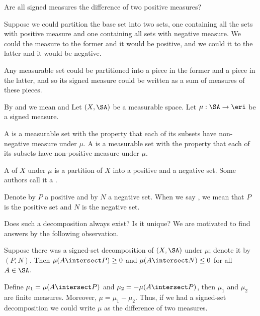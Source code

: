 \sbasic


\sstart



Are all signed measures
the difference of two
positive measures?

Suppose we could partition
the base set into two
sets, one containing
all the sets with positive
measure and one containing
all sets with negative measure.
We could
 the measure to
the former and it would
be positive, and we could
 it to the latter
and it would be negative.

Any measurable set could be partitioned
into a piece in the former and a
piece in the latter, and so
its signed measure could be
written as a sum of measures
of these pieces.


By  and
we mean 
and 
Let $(X, \SA)$ be
a measurable space.
Let $\mu: \SA \to \eri$
be a signed measure.

A 
is a measurable set
with the property that
each of its subsets have
non-negative measure
under $\mu$.
A 
is a measurable set
with the property that
each of its subsets have
non-positive measure
under $\mu$.

A 
of $X$ under $\mu$
is a partition of $X$
into a positive and a negative set.
Some authors call it a
.


Denote by $P$ a positive
and by $N$ a negative set.
When we say ,
we mean that $P$ is
the positive set and $N$
is the negative set.


Does such a decomposition
always exist? Is it unique?
We are motivated to find
answers
by the following observation.

Suppose there was a signed-set
decomposition of $(X, \SA)$
under $\mu$; denote it by $(P, N)$.
Then
$\mu(A \intersect P) \geq 0$
and $\mu(A \intersect N) \leq 0$
for all $A \in \SA$.

Define
$\mu_1 = \mu(A \intersect P)$
and $\mu_2 = -\mu(A \intersect P)$,
then $\mu_1$ and $\mu_2$ are finite measures.
Moreover, $\mu = \mu_1 - \mu_2$.
Thus, if we had a signed-set decomposition
we could write $\mu$ as the difference
of two measures.



\strats
